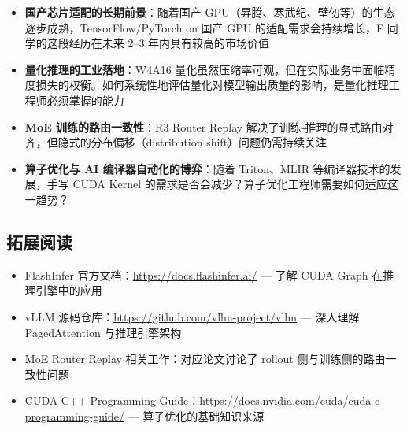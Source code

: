 \documentclass[a4paper]{article}
\begin{document}
\begin{itemize}
    \item \textbf{国产芯片适配的长期前景}：随着国产 GPU（昇腾、寒武纪、壁仞等）的生态逐步成熟，TensorFlow/PyTorch on 国产 GPU 的适配需求会持续增长，F 同学的这段经历在未来 2--3 年内具有较高的市场价值
    \item \textbf{量化推理的工业落地}：W4A16 量化虽然压缩率可观，但在实际业务中面临精度损失的权衡。如何系统性地评估量化对模型输出质量的影响，是量化推理工程师必须掌握的能力
    \item \textbf{MoE 训练的路由一致性}：R3 Router Replay 解决了训练-推理的显式路由对齐，但隐式的分布偏移（distribution shift）问题仍需持续关注
    \item \textbf{算子优化与 AI 编译器自动化的博弈}：随着 Triton、MLIR 等编译器技术的发展，手写 CUDA Kernel 的需求是否会减少？算子优化工程师需要如何适应这一趋势？
\end{itemize}

\subsection{拓展阅读}

\begin{itemize}
    \item FlashInfer 官方文档：\href{https://docs.flashinfer.ai/}{https://docs.flashinfer.ai/} — 了解 CUDA Graph 在推理引擎中的应用
    \item vLLM 源码仓库：\href{https://github.com/vllm-project/vllm}{https://github.com/vllm-project/vllm} — 深入理解 PagedAttention 与推理引擎架构
    \item MoE Router Replay 相关工作：对应论文讨论了 rollout 侧与训练侧的路由一致性问题
    \item CUDA C++ Programming Guide：\href{https://docs.nvidia.com/cuda/cuda-c-programming-guide/}{https://docs.nvidia.com/cuda/cuda-c-programming-guide/} — 算子优化的基础知识来源
\end{itemize}
\end{document}
